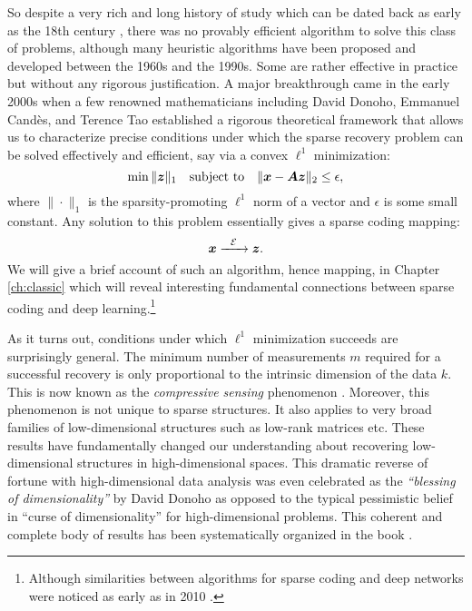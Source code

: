 \documentclass[../../book-main.tex]{subfiles}
\begin{document}
So despite a very rich and long history of study which can be dated back as early as  the 18th century \cite{Boscovichca1750}, there was no provably efficient algorithm to solve this class of problems, although many heuristic algorithms have been proposed and developed between the 1960s and the 1990s. Some are rather effective in practice but without any rigorous justification. A major breakthrough came in the early 2000s when a few renowned mathematicians including David Donoho, Emmanuel Cand\`{e}s, and Terence Tao \cite{donoho2005neighborly,Candes2005,CandesE2005-IT} established a rigorous theoretical framework that allows us to characterize  precise conditions under which the sparse recovery problem can be solved effectively and efficient, say via a convex $\ell^1$ minimization:
\begin{equation}
    \min \|\bm{z}\|_1 \quad \mbox{subject to} \quad \| \bm{x} - \boldsymbol{A}\bm{z}\|_2 \le \epsilon,
\end{equation}
where $\|\cdot \|_1$ is the sparsity-promoting $\ell^1$ norm of a vector and $\epsilon$ is some small constant. Any solution to this problem essentially gives a sparse coding mapping:
\begin{equation}
    \bm{x}   \xrightarrow{\hspace{2mm} \mathcal{E} \hspace{2mm}}  \bm{z}.
       \label{eqn:decoding-sparse}
\end{equation}
We will give a brief account of such an algorithm, hence mapping, in Chapter \ref{ch:classic} which will reveal interesting fundamental connections between sparse coding and deep learning.\footnote{Although similarities between algorithms for sparse coding and deep networks were noticed as early as in 2010 \cite{gregor2010learning}.}

As it turns out, conditions under which $\ell^1$ minimization succeeds are surprisingly general. The minimum number of measurements $m$ required for a successful recovery is only proportional to the intrinsic dimension of the data $k$. This is now known as the {\em compressive sensing} phenomenon \cite{CandesE2006-ICM}. Moreover, this phenomenon is not unique to sparse structures. It also applies to very broad families of low-dimensional structures such as low-rank matrices etc. These results have fundamentally changed our understanding about recovering low-dimensional structures in high-dimensional spaces. This dramatic reverse of fortune with high-dimensional data analysis was even celebrated as the {\em ``blessing of dimensionality''} by David Donoho \cite{DonohoD2000} as opposed to the typical pessimistic belief in  ``curse of dimensionality'' for high-dimensional problems. This coherent and complete body of results has  been systematically organized in the book \cite{Wright-Ma-2022}. 
\end{document}
